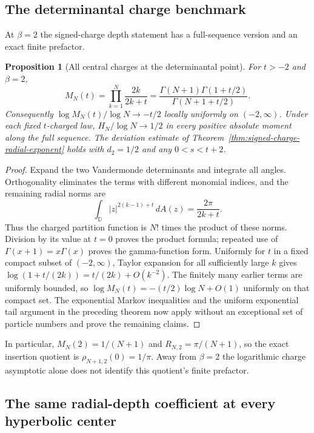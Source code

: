 \documentclass[11pt,a4paper]{article}
\numberwithin{equation}{section}
\newtheorem{proposition}[theorem]{Proposition}
\theoremstyle{definition}
\theoremstyle{remark}
\newcommand{\D}{\mathbb D}
\begin{document}
\subsection{The determinantal charge benchmark}
\label{subsec:charged-depth-beta2-benchmark}

At $\beta=2$ the signed-charge depth statement has a full-sequence
version and an exact finite prefactor.

\begin{proposition}[All central charges at the determinantal point]
\label{prop:charged-depth-beta2-benchmark}
For $t>-2$ and $\beta=2$,
\[
 M_N(t)=\prod_{k=1}^N\frac{2k}{2k+t}
       =\frac{\Gamma(N+1)\Gamma(1+t/2)}{\Gamma(N+1+t/2)}.
\]
Consequently $\log M_N(t)/\log N\to-t/2$ locally uniformly
on $(-2,\infty)$. Under each fixed $t$-charged law,
$H_N/\log N\to1/2$ in every positive absolute moment along the
full sequence. The deviation estimate of
Theorem~\ref{thm:signed-charge-radial-exponent} holds with
$d_2=1/2$ and any $0<s<t+2$.
\end{proposition}

\begin{proof}
Expand the two Vandermonde determinants and integrate all angles.
Orthogonality eliminates the terms with different monomial indices,
and the remaining radial norms are
\[
 \int_{\D}|z|^{2(k-1)+t}\,dA(z)=\frac{2\pi}{2k+t}.
\]
Thus the charged partition function is $N!$ times the product of
these norms. Division by its value at $t=0$ proves the product
formula; repeated use of $\Gamma(x+1)=x\Gamma(x)$ proves the
gamma-function form. Uniformly for $t$ in a fixed compact subset
of $(-2,\infty)$, Taylor expansion for all sufficiently large $k$
gives $\log(1+t/(2k))=t/(2k)+O(k^{-2})$.
The finitely many earlier terms are uniformly bounded, so
$\log M_N(t)=-(t/2)\log N+O(1)$ uniformly on that compact set.
The exponential Markov inequalities and the uniform exponential
tail argument in the preceding theorem now apply without an
exceptional set of particle numbers and prove the remaining claims.
\end{proof}

In particular, $M_N(2)=1/(N+1)$ and
$R_{N,2}=\pi/(N+1)$, so the exact insertion quotient is
$\rho_{N+1,2}(0)=1/\pi$. Away from $\beta=2$ the logarithmic
charge asymptotic alone does not identify this quotient's finite
prefactor.


\subsection{The same radial-depth coefficient at every hyperbolic center}
\label{subsec:all-anchor-radial-depth}
\end{document}
